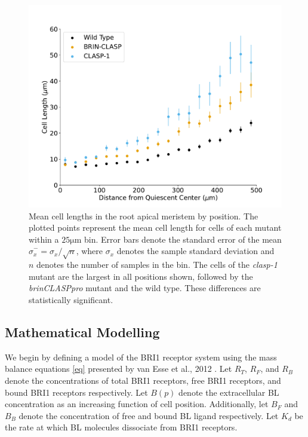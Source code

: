 \documentclass[referee,pdflatex,sn-mathphys-num]{sn-jnl}
\newcommand{\um}{\unit{\micro\metre}}
\begin{document}
\begin{figure}
\centering
\includegraphics[width=\textwidth]{data-binned-500.pdf}
\caption{Mean cell lengths in the root apical meristem by position.
The plotted points represent the mean cell length for cells of each mutant within a $25\um$ bin.
Error bars denote the standard error of the mean $\hat{\sigma}_{x}^{-} = \sigma_{x} / \sqrt{n}$, where $\sigma_{x}$ denotes the sample standard deviation and $n$ denotes the number of samples in the bin.
The cells of the \emph{clasp-1} mutant are the largest in all positions shown, followed by the \emph{brinCLASPpro} mutant and the wild type.
These differences are statistically significant.}
\label{data-binned}
\end{figure}

\subsection{Mathematical Modelling}\label{22}

We begin by defining a model of the BRI1 receptor system using the mass balance equations \eqref{eq} presented by van Esse et al., 2012 \cite{vanesse2012}.
Let $R_{T}$, $R_{F}$, and $R_{B}$ denote the concentrations of total BRI1 receptors, free BRI1 receptors, and bound BRI1 receptors respectively.
Let $B(p)$ denote the extracellular BL concentration as an increasing function of cell position.
Additionally, let $B_{F}$ and $B_{B}$ denote the concentration of free and bound BL ligand respectively.
Let $K_{d}$ be the rate at which BL molecules dissociate from BRI1 receptors.
\end{document}
